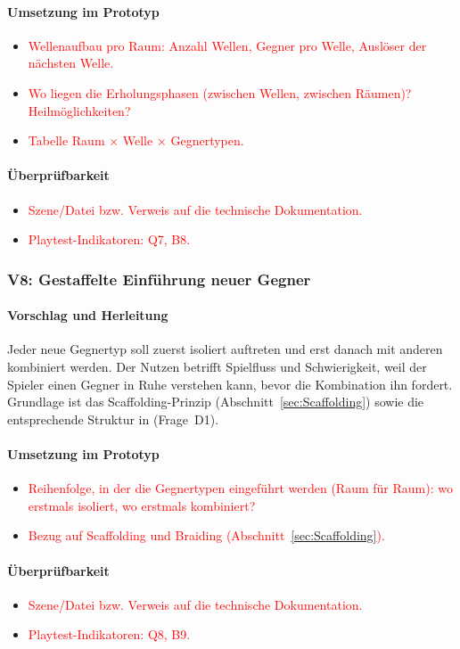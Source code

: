 \documentclass[../Main.tex]{subfiles}
\begin{document}
\paragraph{Umsetzung im Prototyp}
\begin{itemize}[leftmargin=1.5cm]
    \item \textcolor{red}{Wellenaufbau pro Raum: Anzahl Wellen, Gegner pro Welle, Auslöser der nächsten Welle.}
    \item \textcolor{red}{Wo liegen die Erholungsphasen (zwischen Wellen, zwischen Räumen)? Heilmöglichkeiten?}
    \item \textcolor{red}{Tabelle Raum $\times$ Welle $\times$ Gegnertypen.}
\end{itemize}

\paragraph{Überprüfbarkeit}
\begin{itemize}[leftmargin=1.5cm]
    \item \textcolor{red}{Szene/Datei bzw. Verweis auf die technische Dokumentation.}
    \item \textcolor{red}{Playtest-Indikatoren: Q7, B8.}
\end{itemize}

\subsubsection{V8: Gestaffelte Einführung neuer Gegner} \label{sec:V8}

\paragraph{Vorschlag und Herleitung}
Jeder neue Gegnertyp soll zuerst isoliert auftreten und erst danach mit anderen kombiniert werden. Der Nutzen betrifft Spielfluss und Schwierigkeit, weil der Spieler einen Gegner in Ruhe verstehen kann, bevor die Kombination ihn fordert. Grundlage ist das Scaffolding-Prinzip (Abschnitt~\ref{sec:Scaffolding}) sowie die entsprechende Struktur in  (Frage~D1).

\paragraph{Umsetzung im Prototyp}
\begin{itemize}[leftmargin=1.5cm]
    \item \textcolor{red}{Reihenfolge, in der die Gegnertypen eingeführt werden (Raum für Raum): wo erstmals isoliert, wo erstmals kombiniert?}
    \item \textcolor{red}{Bezug auf Scaffolding und Braiding (Abschnitt~\ref{sec:Scaffolding}).}
\end{itemize}

\paragraph{Überprüfbarkeit}
\begin{itemize}[leftmargin=1.5cm]
    \item \textcolor{red}{Szene/Datei bzw. Verweis auf die technische Dokumentation.}
    \item \textcolor{red}{Playtest-Indikatoren: Q8, B9.}
\end{itemize}
\end{document}
